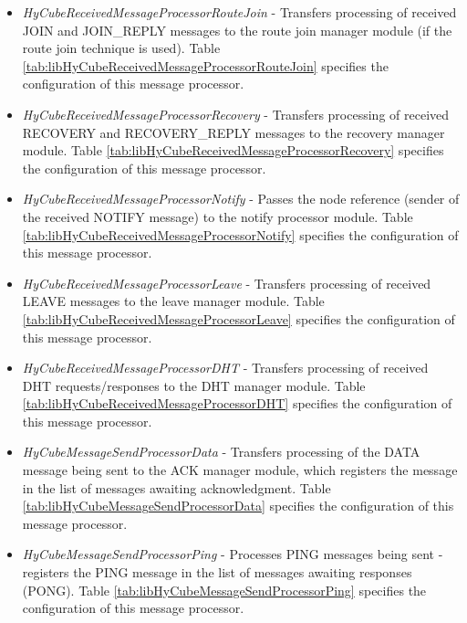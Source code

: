 \begin{itemize}
	\item \emph{HyCubeReceivedMessageProcessorRouteJoin} - Transfers processing of received JOIN and JOIN\_REPLY messages to the route join manager module (if the route join technique is used). Table \ref{tab:libHyCubeReceivedMessageProcessorRouteJoin} specifies the configuration of this message processor.
	
	
	
	\item \emph{HyCubeReceivedMessageProcessorRecovery} - Transfers processing of received RECOVERY and RECOVERY\_REPLY messages to the recovery manager module. Table \ref{tab:libHyCubeReceivedMessageProcessorRecovery} specifies the configuration of this message processor.
	
	\item \emph{HyCubeReceivedMessageProcessorNotify} - Passes the node reference (sender of the received NOTIFY message) to the notify processor module. Table \ref{tab:libHyCubeReceivedMessageProcessorNotify} specifies the configuration of this message processor.
	
	\item \emph{HyCubeReceivedMessageProcessorLeave} - Transfers processing of received LEAVE messages to the leave manager module. Table \ref{tab:libHyCubeReceivedMessageProcessorLeave} specifies the configuration of this message processor.
	
	\item \emph{HyCubeReceivedMessageProcessorDHT} - Transfers processing of received DHT requests/responses to the DHT manager module. Table \ref{tab:libHyCubeReceivedMessageProcessorDHT} specifies the configuration of this message processor.

	
	

	
	\item \emph{HyCubeMessageSendProcessorData} - Transfers processing of the DATA message being sent to the ACK manager module, which registers the message in the list of messages awaiting acknowledgment. Table \ref{tab:libHyCubeMessageSendProcessorData} specifies the configuration of this message processor.

	
	\item \emph{HyCubeMessageSendProcessorPing} - Processes PING messages being sent - registers the PING message in the list of messages awaiting responses (PONG). Table \ref{tab:libHyCubeMessageSendProcessorPing} specifies the configuration of this message processor.

	
	
	
\end{itemize}




